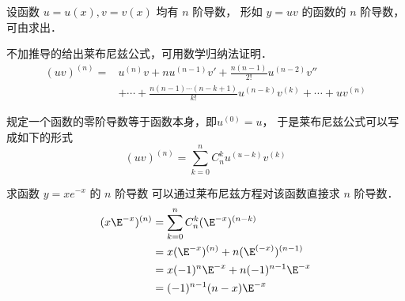 

设函数 $u=u(x), v=v(x)$ 均有 $n$ 阶导数， 形如 $y=uv$ 的函数的 $n$ 阶导数， 可由求出．

不加推导的给出莱布尼兹公式，可用数学归纳法证明．
\begin{equation}
\begin{aligned}
(uv)^{(n)}=&u^{(n)}v+nu^{(n-1)}v'+\frac{n(n-1)}{2!}u^{(n-2)}v'' \\
&+ \cdots +\frac{n(n-1) \cdots (n-k+1)}{k!}u^{(n-k)}v^{(k)}+\cdots+uv^{(n)}
\end{aligned}
\end{equation}

规定一个函数的零阶导数等于函数本身，即$u^{(0)}=u$， 于是莱布尼兹公式可以写成如下的形式
\begin{equation}
(uv)^{(n)}=\sum_{k=0}^{n} C_{n}^{k}u^{(u-k)}v^{(k)}
\end{equation}

\begin{exam}{求函数 $y=xe^{-x}$ 的 $n$ 阶导数}
可以通过莱布尼兹方程对该函数直接求 $n$ 阶导数．
\begin{equation}
\begin{aligned}
(x\E^{-x})^{(n)}&=\sum_{k=0}^{n} C_{n}^{k}(\E^{-x})^{(n-k)}\\
&=x(\E^{-x})^{(n)}+n(\E^{(-x)})^{(n-1)}\\
&=x(-1)^n\E^{-x}+n(-1)^{n-1}\E^{-x}\\
&=(-1)^{n-1}(n-x)\E^{-x}
\end{aligned}
\end{equation}
\end{exam}
